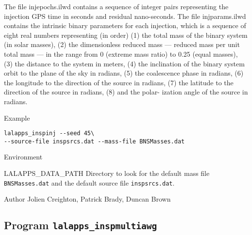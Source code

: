 \begin{entry}
\begin{entry}
The  file  injepochs.ilwd  contains  a sequence of integer pairs representing
the injection GPS time in  seconds  and residual  nano-seconds.   The file
injparams.ilwd contains the intrinsic binary parameters for each injection,
which is  a  sequence  of  eight  real  numbers representing (in order) (1) the
total mass of the binary system  (in  solar masses),  (2)  the  dimensionless
reduced mass --- reduced mass per unit total mass --- in the range from  0
(extreme mass  ratio)  to  0.25 (equal masses), (3) the distance to the system
in meters, (4) the inclination  of  the  binary system  orbit  to the plane of
the sky in radians, (5) the coalescence phase in radians, (6)  the  longitude
to  the direction  of  the  source in radians, (7) the latitude to the
direction of the source in radians, (8) and the polar- ization angle of the
source in radians.
\end{entry}

\item[Example]
\begin{verbatim}
lalapps_inspinj --seed 45\
--source-file inspsrcs.dat --mass-file BNSMasses.dat
\end{verbatim}

\item[Environment]\leavevmode
\begin{entry}
\item[LALAPPS\_DATA\_PATH] Directory to look for the default mass
file \verb+BNSMasses.dat+ and the default source file \verb+inspsrcs.dat+.
\end{entry}


\item[Author] 
Jolien Creighton, Patrick Brady, Duncan Brown
\end{entry}







%
% 
\clearpage
\subsection{Program \texttt{lalapps\_inspmultiawg}}
\label{program:lalapps-inspmultiawg}

